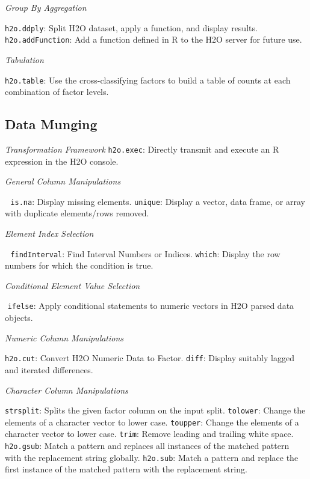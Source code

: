 \documentclass[11pt]{article}
\begin{document}
{{{\emph{Group By Aggregation}\par
{\texttt{h2o.ddply}}: Split H2O dataset, apply a function, and display results.\newline
{\texttt{h2o.addFunction}}: Add a function defined in R to the H2O server for future use. \newline

\emph{Tabulation}\par
{\texttt{h2o.table}}: Use the cross-classifying factors to build a table of counts at each combination of factor levels.

\subsection{Data Munging}\par

\emph{Transformation Framework}\newline
{\texttt{h2o.exec}}: Directly transmit and execute an R expression in the H2O console.\newline

\emph{General Column Manipulations}\par 
{\texttt{is.na}}: Display missing elements.  \newline
{\texttt{unique}}: Display a vector, data frame, or array with duplicate elements/rows removed.\newline

\emph{Element Index Selection}\par 
{\texttt{findInterval}}: Find Interval Numbers or Indices.\newline
{\texttt{which}}: Display the row numbers for which the condition is true.\newline

\emph{Conditional Element Value Selection}\par {\texttt{ifelse}}: Apply conditional statements to numeric vectors in H2O parsed data objects.\newline

\emph{Numeric Column Manipulations}\par
{\texttt{h2o.cut}}: Convert H2O Numeric Data to Factor. \newline
{\texttt{diff}}: Display suitably lagged and iterated differences.\newline

\emph{Character Column Manipulations}\par
{\texttt{strsplit}}: Splits the given factor column on the input split. \newline
{\texttt{tolower}}: Change the elements of a character vector to lower case. \newline
{\texttt{toupper}}: Change the elements of a character vector to lower case. \newline
{\texttt{trim}}: Remove leading and trailing white space.\newline
{\texttt{h2o.gsub}}: Match a pattern and replaces all instances of the matched pattern with the replacement string globally. \newline
{\texttt{h2o.sub}}: Match a pattern and replace the first instance of the matched pattern with the replacement string.\newline

}}}
\end{document}
